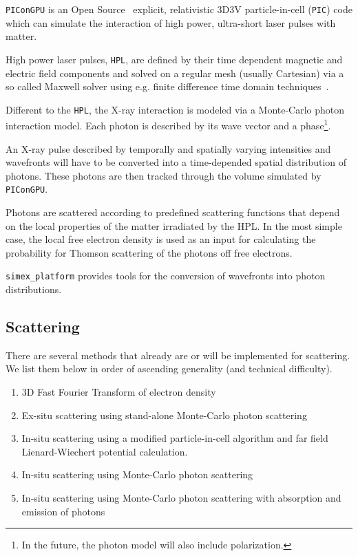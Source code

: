 \documentclass[a4paper]{article}
\begin{document}
\texttt{PIConGPU} is an Open Source~\cite{picongpu_github} explicit, relativistic 3D3V particle-in-cell (\texttt{PIC}) code which can simulate the interaction of high power, ultra-short laser pulses with matter. 

High power laser pulses, \texttt{HPL}, are defined by their time dependent magnetic and electric field components and solved on a regular mesh (usually Cartesian) via a so called Maxwell solver using e.g. finite difference time domain techniques~\cite{Yee1966}.

Different to the \texttt{HPL}, the X-ray interaction is modeled via a Monte-Carlo photon interaction model. Each photon is described by its wave vector and a phase\footnote{In the future, the photon model will also include polarization.}.

An X-ray pulse described by temporally and spatially varying intensities and wavefronts will have to be converted into a time-depended spatial distribution of photons. These photons are then tracked through the volume simulated by \texttt{PIConGPU}.

Photons are scattered according to predefined scattering functions that depend on the local properties of the matter irradiated by the HPL. In the most simple case, the local free electron density is used as an input for calculating the probability for Thomson scattering of the photons off free electrons.

\texttt{simex\_platform} provides tools for the conversion of wavefronts into photon distributions.
\subsection{Scattering}

There are several methods that already are or will be implemented for scattering. We list them below in order of ascending generality (and technical difficulty).

\begin{enumerate}
\item 3D Fast Fourier Transform of electron density \label{pmi:methods:fft}
\item Ex-situ scattering using stand-alone Monte-Carlo photon scattering \label{pmi:methods:exsituphoton}
\item In-situ scattering using a modified particle-in-cell algorithm and far field Lienard-Wiechert potential calculation.\label{pmi:methods:insitulienardwiechert}
\item In-situ scattering using Monte-Carlo photon scattering\label{pmi:methods:insituphoton}
\item In-situ scattering using Monte-Carlo photon scattering with absorption and emission of photons\label{pmi:methods:insituphotoninteract}
\end{enumerate}
\end{document}
